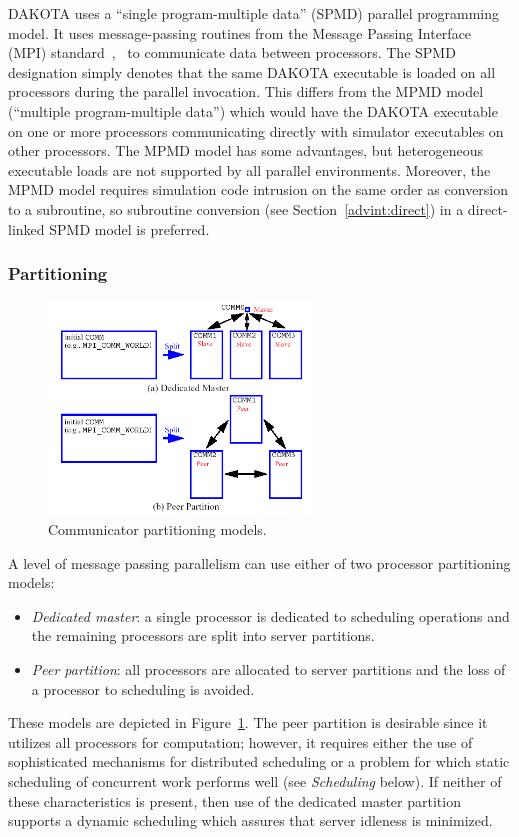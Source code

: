 DAKOTA uses a ``single program-multiple data'' (SPMD) parallel
programming model. It uses message-passing routines from the Message
Passing Interface (MPI) standard~\cite{Gro94},~\cite{Sni96} to
communicate data between processors. The SPMD designation simply
denotes that the same DAKOTA executable is loaded on all processors
during the parallel invocation. This differs from the MPMD model
(``multiple program-multiple data'') which would have the DAKOTA
executable on one or more processors communicating directly with
simulator executables on other processors. The MPMD model has some
advantages, but heterogeneous executable loads are not supported by
all parallel environments. Moreover, the MPMD model requires
simulation code intrusion on the same order as conversion to a
subroutine, so subroutine conversion (see Section~\ref{advint:direct})
in a direct-linked SPMD model is preferred.

\subsubsection{Partitioning}\label{parallel:SLP:message:part}

\begin{figure}
  \includegraphics[width=70mm]{images/comm_partitioning}
  \caption{Communicator partitioning models.}
  \label{parallel:figure01}
\end{figure}

A level of message passing parallelism can use either of two processor
partitioning models:
\begin{itemize}
\item \emph{Dedicated master}: a single processor is dedicated to
scheduling operations and the remaining processors are split into
server partitions.

\item \emph{Peer partition}: all processors are allocated to server
partitions and the loss of a processor to scheduling is avoided.
\end{itemize}
These models are depicted in Figure~\ref{parallel:figure01}. The peer
partition is desirable since it utilizes all processors for
computation; however, it requires either the use of sophisticated
mechanisms for distributed scheduling or a problem for which static
scheduling of concurrent work performs well (see \emph{Scheduling}
below).  If neither of these characteristics is present, then use of
the dedicated master partition supports a dynamic scheduling which
assures that server idleness is minimized.

